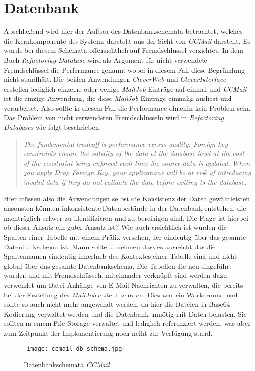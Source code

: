 \section{Datenbank}
\label{sec:ccmail-datanbank}
Abschließend wird hier der Aufbau des Datenbankschemata betrachtet, welches die Kernkomponente des Systems darstellt aus der Sicht von \emph{CCMail} darstellt.
Es wurde bei diesem Schemata offensichtlich auf Fremdschlüssel verzichtet. 
In dem Buch \emph{Refactoring Database} \cite[213]{refactoreDatabase} wird als Argument für nicht verwendete Fremdschlüssel die Performance genannt wobei in diesem Fall diese Begründung nicht standhält. Die beiden Anwendungen \emph{CleverWeb} und \emph{CleverInterface} erstellen lediglich einzelne oder wenige \emph{MailJob} Einträge auf einmal und \emph{CCMail} ist die einzige Anwendung, die diese \emph{MailJob} Einträge einmalig ausliest und verarbeitet. Also sollte in diesem Fall die Performance ohnehin kein Problem sein. Das Problem von nicht verwendeten Fremdschlüsseln wird in \emph{Refactoring Databases} \cite[213]{refactoreDatabase} wie folgt beschrieben.
\begin{quote}
\emph{The fundemental tradeoff is performance versus quality: Foreign key constraints ensure the validity of the data at the database level at the cost of the constraint being enforced each time the source data is updated. When you apply Drop Foreign Key, your applications will be at risk of introducing invalid data if they do not validate the data before writing to the database.}
\end{quote}
Hier müssen also die Anwendungen selbst die Konsistenz der Daten gewährleisten ansonsten könnten inkonsistente Datenbestände in der Datenbank entstehen, die nachträglich schwer zu identifizieren und zu bereinigen sind. Die Frage ist hierbei ob dieser Ansatz ein guter Ansatz ist?
\newline
\newline
Wie auch ersichtlich ist wurden die Spalten einer Tabelle mit einem Präfix versehen, der eindeutig über das gesamte Datenbankschema ist. Mann sollte annehmen dass es ausreicht das die Spaltennamen eindeutig innerhalb des Kontextes einer Tabelle sind und nicht global über das gesamte Datenbankschema. Die Tabellen die neu eingeführt wurden und mit Fremdschlüsseln miteinander verknüpft sind werden dazu verwendet um Datei Anhänge von E-Mail-Nachrichten zu verwalten, die bereits bei der Erstellung des \emph{MailJob} erstellt wurden. Dies war ein Workaround und sollte so auch nicht mehr angewandt werden, da hier die Dateien in Base64 Kodierung verwaltet werden und die Datenbank unnötig mit Daten belasten. Sie sollten in einem File-Storage verwaltet und lediglich referenziert werden, was aber zum Zeitpunkt der Implementierung noch nciht zur Verfügung stand. 
\begin{figure}[h]
\centering
\texttt{[image: ccmail\_db\_schema.jpg]} 
\caption{Datenbankschemata \emph{CCMail}}
\label{fig:ccmail-db-schema}
\end{figure}
